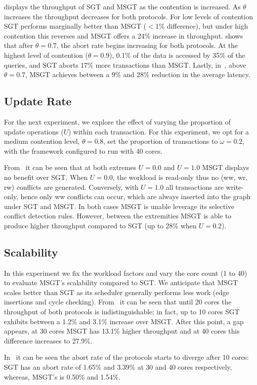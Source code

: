


 displays the throughput 
of SGT and MSGT as the contention is increased. 
As $\theta$ increases the throughput decreases
for both protocols. For low levels of contention
SGT performs marginally better than MSGT ($<$1\% 
difference), but under high contention this reverses 
and MSGT offers a 24\% increase in throughput.
 shows that after $\theta = 0.7$, 
the abort rate begins increasing for both protocols. 
At the highest level of contention ($\theta = 0.9$), 
0.1\% of the data is accessed by 35\% of the queries, 
and SGT aborts 17\% more transactions than MSGT. Lastly, 
in~, above $\theta = 0.7$, MSGT 
achieves between a 9\% and 28\% reduction in the average 
latency.

\subsection{Update Rate}
\label{sec:update-rate}

For the next experiment, we explore the effect of 
varying the proportion of update operations ($U$) within 
each transaction. For this experiment, we opt for a
medium contention level, $\theta = 0.8$, set the 
proportion of  transactions to $\omega = 0.2$, with the framework configured to run with 40 cores. 

From~ it can be seen that at 
both extremes $U=0.0$ and $U=1.0$ MSGT displays no 
benefit over SGT. When $U=0.0$, the workload is 
read-only thus no (\textsf{ww}, \textsf{wr}, 
\textsf{rw}) conflicts are generated. Conversely, with 
$U=1.0$ all transactions are write-only, hence only 
\textsf{ww} conflicts can occur, which are always inserted
into the graph under SGT and MSGT. In both cases MSGT is 
unable leverage its selective conflict detection rules.
However, between the extremities MSGT is able to produce 
higher throughput compared to SGT (up to 28\% when $U=0.2$).



\subsection{Scalability}
\label{sec:scalability}

In this experiment we fix the workload factors and vary 
the core count (1 to 40) to evaluate MSGT's scalability 
compared to SGT. We anticipate that MSGT scales better 
than SGT as its scheduler generally performs less work 
(edge insertions and cycle checking). 
From~ it can be seen that until 
20 cores the throughput of both protocols is 
indistinguishable; in fact, up to 10 cores SGT exhibits 
between a 1.2\% and 3.1\% increase over MSGT. After this 
point, a gap appears, at 30 cores MSGT has 13.1\% higher 
throughput and at 40 cores this difference increases to 
27.9\%. 

In~ it can be seen the abort 
rate of the protocols starts to diverge after 10 
cores: SGT has an abort rate of 1.65\% and 3.39\% at 30 
and 40 cores respectively, whereas, MSGT's is 0.50\% and 
1.54\%.



